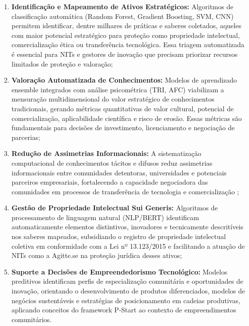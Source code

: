 \begin{enumerate}
\item \textbf{Identificação e Mapeamento de Ativos Estratégicos:} Algoritmos de classificação automática (Random Forest, Gradient Boosting, SVM, CNN) permitem identificar, dentre milhares de práticas e saberes coletados, aqueles com maior potencial estratégico para proteção como propriedade intelectual, comercialização ética ou transferência tecnológica. Essa triagem automatizada é essencial para NITs e gestores de inovação que precisam priorizar recursos limitados de proteção e valoração;

\item \textbf{Valoração Automatizada de Conhecimentos:} Modelos de aprendizado ensemble integrados com análise psicométrica (TRI, AFC) viabilizam a mensuração multidimensional do valor estratégico de conhecimentos tradicionais, gerando métricas quantitativas de valor cultural, potencial de comercialização, aplicabilidade científica e risco de erosão. Essas métricas são fundamentais para decisões de investimento, licenciamento e negociação de parcerias;

\item \textbf{Redução de Assimetrias Informacionais:} A sistematização computacional de conhecimentos tácitos e difusos reduz assimetrias informacionais entre comunidades detentoras, universidades e potenciais parceiros empresariais, fortalecendo a capacidade negociadora das comunidades em processos de transferência de tecnologia e comercialização \cite{AroraEtAl2001};

\item \textbf{Gestão de Propriedade Intelectual Sui Generis:} Algoritmos de processamento de linguagem natural (NLP/BERT) identificam automaticamente elementos distintivos, inovadores e tecnicamente descritíveis nos saberes mapeados, subsidiando o registro de propriedade intelectual coletiva em conformidade com a Lei nº 13.123/2015 e facilitando a atuação de NITs como a Agitte.se na proteção jurídica desses ativos;

\item \textbf{Suporte a Decisões de Empreendedorismo Tecnológico:} Modelos preditivos identificam perfis de especialização comunitária e oportunidades de inovação, orientando o desenvolvimento de produtos diferenciados, modelos de negócios sustentáveis e estratégias de posicionamento em cadeias produtivas, aplicando conceitos do framework P-Start \cite{Souza2022} ao contexto de empreendimentos comunitários.
\end{enumerate}

